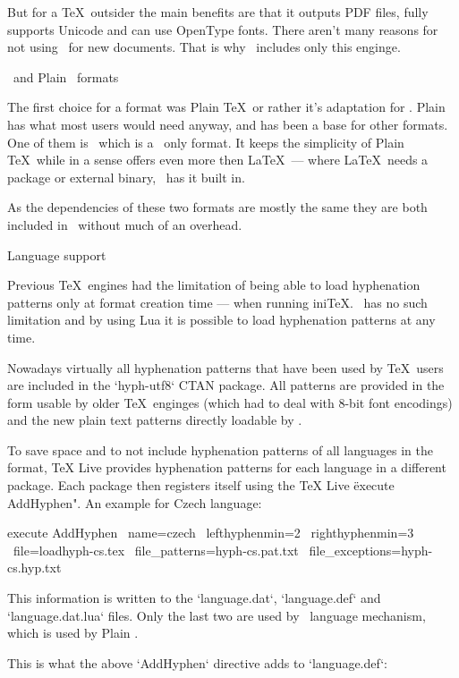 But for a \TeX\ outsider the main benefits are that it outputs PDF files, fully
supports Unicode and can use OpenType fonts. There aren't many reasons for not
using \LuaTeX\ for new documents. That is why \LLTeX\ includes only this
enginge.

\sec \OpTeX\ and Plain \LuaTeX\ formats

The first choice for a format was Plain \TeX\ or rather it's adaptation for
\LuaTeX. Plain has what most users would need anyway, and has been a base for
other formats. One of them is \OpTeX\ which is a \LuaTeX\ only format. It keeps
the simplicity of Plain \TeX\ while in a sense offers even more then \LaTeX\
--- where \LaTeX\ needs a package or external binary, \OpTeX\ has it built in.

As the dependencies of these two formats are mostly the same they are both
included in \LLTeX\ without much of an overhead.

\sec Language support

Previous \TeX\ engines had the limitation of being able to load hyphenation
patterns only at format creation time --- when running ini\TeX. \LuaTeX\ has no
such limitation and by using Lua it is possible to load hyphenation patterns at
any time.

Nowadays virtually all hyphenation patterns that have been used by \TeX\ users
are included in the `hyph-utf8` CTAN package. All patterns are provided in the
form usable by older \TeX\ enginges (which had to deal with 8-bit font
encodings) and the new plain text patterns directly loadable by \LuaTeX.

To save space and to not include hyphenation patterns of all languages in the
format, TeX Live provides hyphenation patterns for each language in a different
package. Each package then registers itself using the TeX Live \"execute
AddHyphen". An example for Czech language:

\begtt
execute AddHyphen \
	name=czech \
	lefthyphenmin=2 \
	righthyphenmin=3 \
	file=loadhyph-cs.tex \
	file_patterns=hyph-cs.pat.txt \
	file_exceptions=hyph-cs.hyp.txt
\endtt

This information is written to the `language.dat`, `language.def` and
`language.dat.lua` files. Only the last two are used by \eTeX\ language
mechanism, which is used by Plain \LuaTeX.

This is what the above `AddHyphen` directive adds to `language.def`:

\begtt
\addlanguage{czech}{loadhyph-cs.tex}{}{2}{3}
\endtt

